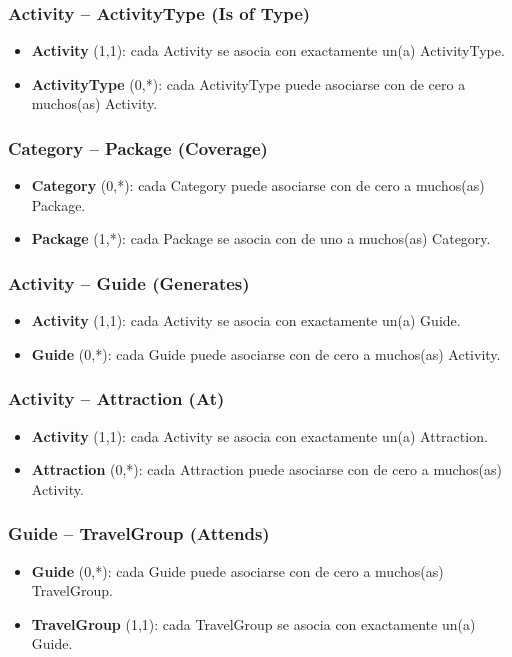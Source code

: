\documentclass[11pt,a4paper]{article}
\begin{document}
\subsubsection{Activity – ActivityType (Is of Type)}
\begin{itemize}[leftmargin=1.2em,itemsep=2pt,topsep=3pt]
\item \textbf{Activity} (1,1): cada Activity se asocia con exactamente un(a) ActivityType.
\item \textbf{ActivityType} (0,*): cada ActivityType puede asociarse con de cero a muchos(as) Activity.
\end{itemize}
\subsubsection{Category – Package (Coverage)}
\begin{itemize}[leftmargin=1.2em,itemsep=2pt,topsep=3pt]
\item \textbf{Category} (0,*): cada Category puede asociarse con de cero a muchos(as) Package.
\item \textbf{Package} (1,*): cada Package se asocia con de uno a muchos(as) Category.
\end{itemize}
\subsubsection{Activity – Guide (Generates)}
\begin{itemize}[leftmargin=1.2em,itemsep=2pt,topsep=3pt]
\item \textbf{Activity} (1,1): cada Activity se asocia con exactamente un(a) Guide.
\item \textbf{Guide} (0,*): cada Guide puede asociarse con de cero a muchos(as) Activity.
\end{itemize}
\subsubsection{Activity – Attraction (At)}
\begin{itemize}[leftmargin=1.2em,itemsep=2pt,topsep=3pt]
\item \textbf{Activity} (1,1): cada Activity se asocia con exactamente un(a) Attraction.
\item \textbf{Attraction} (0,*): cada Attraction puede asociarse con de cero a muchos(as) Activity.
\end{itemize}
\subsubsection{Guide – TravelGroup (Attends)}
\begin{itemize}[leftmargin=1.2em,itemsep=2pt,topsep=3pt]
\item \textbf{Guide} (0,*): cada Guide puede asociarse con de cero a muchos(as) TravelGroup.
\item \textbf{TravelGroup} (1,1): cada TravelGroup se asocia con exactamente un(a) Guide.
\end{itemize}
\end{document}
